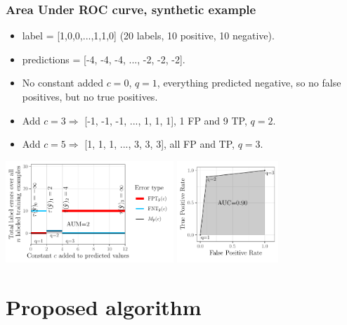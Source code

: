 \documentclass{beamer}
\begin{document}
\begin{frame}
  \frametitle{Area Under ROC curve, synthetic example}

\begin{itemize}
  \item label = [1,0,0,...,1,1,0] (20 labels, 10 positive, 10 negative).
  \item predictions = [-4, -4, -4, ..., -2, -2, -2].
  \item No constant added $c=0$, $q=1$, everything predicted negative,
    so no false positives, but no true positives.
\item Add $c=3 \Rightarrow$ [-1, -1, -1, ..., 1, 1, 1], 1 FP and
  9 TP, $q=2$.
\item  Add $c=5 \Rightarrow$ [1, 1, 1, ..., 3, 3, 3], all FP and TP, $q=3$.
  \end{itemize}

  \includegraphics[height=1.5in]{figure-more-than-one-less-aum}
  \includegraphics[height=1.5in]{figure-more-than-one-less-auc}

\end{frame}


\section{Proposed algorithm}
\end{document}

